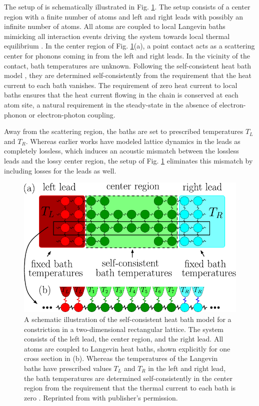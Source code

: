 The setup of  is schematically illustrated in Fig. \ref{fig:schb_setup}. The setup consists of a center region with a finite number of atoms and left and right leads with possibly an infinite number of atoms. All atoms are coupled to local Langevin baths mimicking all interaction events driving the system towards local thermal equilibrium \cite{bolsterli70}. In the center region of Fig. \ref{fig:schb_setup}(a), a point contact acts as a scattering center for phonons coming in from the left and right leads. In the vicinity of the contact, bath temperatures are unknown. Following the self-consistent heat bath model \cite{bolsterli70}, they are determined self-consistently from the requirement that the heat current to each bath vanishes. The requirement of zero heat current to local baths ensures that the heat current flowing in the chain is conserved at each atom site, a natural requirement in the steady-state in the absence of electron-phonon or electron-photon coupling.

Away from the scattering region, the baths are set to prescribed temperatures $T_L$ and $T_R$. Whereas earlier works \cite{dhar06} have modeled lattice dynamics in the leads as completely lossless, which induces an acoustic mismatch between the lossless leads and the lossy center region, the setup of Fig. \ref{fig:schb_setup} eliminates this mismatch by including losses for the leads as well.  %


\begin{figure}
\begin{center}
 \includegraphics[width=.99\columnwidth]{pics/gf_fig1.pdf}
 \caption{A schematic illustration of the self-consistent heat bath model for a constriction in a two-dimensional rectangular lattice. The system consists of the left lead, the center region, and the right lead. All atoms are coupled to Langevin heat baths, shown explicitly for one cross section in (b). Whereas the temperatures of the Langevin baths have prescribed values $T_L$ and $T_R$ in the left and right lead, the bath temperatures are determined self-consistently in the center region from the requirement that the thermal current to each bath is zero \cite{bolsterli70}. Reprinted from  with publisher's permission.}
\label{fig:schb_setup}
\end{center}
\end{figure} 

